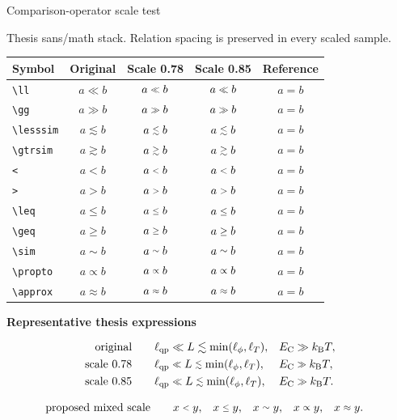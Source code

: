 \documentclass[10pt]{article}
\newcommand{\scaledrel}[2]{%
  \mathrel{\vcenter{\hbox{\scalebox{#1}{$\displaystyle#2$}}}}%
}
\newcommand{\testrow}[2]{%
  \texttt{#1} & $a #2 b$ & $a\scaledrel{0.78}{#2}b$ & $a\scaledrel{0.85}{#2}b$ & $a=b$ \\
}
\begin{document}
\sffamily
\begin{center}
  {\Large Comparison-operator scale test}\par
  \vspace{2mm}
  {\small Thesis sans/math stack. Relation spacing is preserved in every scaled sample.}
\end{center}

\vspace{5mm}
\renewcommand{\arraystretch}{1.7}
\setlength{\tabcolsep}{10pt}
\begin{center}
\begin{tabular}{>{\raggedright\arraybackslash}p{25mm}cccc}
  \toprule
  Symbol & Original & Scale 0.78 & Scale 0.85 & Reference \\
  \midrule
  \testrow{\textbackslash ll}{\ll}
  \testrow{\textbackslash gg}{\gg}
  \testrow{\textbackslash lesssim}{\lesssim}
  \testrow{\textbackslash gtrsim}{\gtrsim}
  \testrow{<}{<}
  \testrow{>}{>}
  \testrow{\textbackslash leq}{\leq}
  \testrow{\textbackslash geq}{\geq}
  \testrow{\textbackslash sim}{\sim}
  \testrow{\textbackslash propto}{\propto}
  \testrow{\textbackslash approx}{\approx}
  \bottomrule
\end{tabular}
\end{center}

\vspace{7mm}
\noindent\textbf{Representative thesis expressions}\par
\vspace{2mm}
\begin{align*}
  \text{original}\qquad
  &\ell_{\mathrm{qp}} \ll L \lesssim \min(\ell_\phi,\ell_T),
  &E_\mathrm C &\gg k_\mathrm BT,\\
  \text{scale 0.78}\qquad
  &\ell_{\mathrm{qp}} \scaledrel{0.78}{\ll} L
    \scaledrel{0.78}{\lesssim}\min(\ell_\phi,\ell_T),
  &E_\mathrm C &\scaledrel{0.78}{\gg}k_\mathrm BT,\\
  \text{scale 0.85}\qquad
  &\ell_{\mathrm{qp}} \scaledrel{0.85}{\ll} L
    \scaledrel{0.85}{\lesssim}\min(\ell_\phi,\ell_T),
  &E_\mathrm C &\scaledrel{0.85}{\gg}k_\mathrm BT.
\end{align*}

\begin{align*}
  \text{proposed mixed scale}\qquad
  x&\scaledrel{0.78}{<}y,
  &x&\scaledrel{0.78}{\leq}y,
  &x&\scaledrel{0.85}{\sim}y,
  &x&\scaledrel{0.85}{\propto}y,
  &x&\scaledrel{0.85}{\approx}y.
\end{align*}
\end{document}
